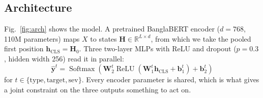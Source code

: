 \documentclass[conference]{IEEEtran}
\begin{document}
\subsection{Architecture}
Fig.~\ref{fig:arch} shows the model. A pretrained BanglaBERT encoder ($d = 768$, 110M parameters) maps $X$ to states $\mathbf{H} \in \mathbb{R}^{L \times d}$, from which we take the pooled first position $\mathbf{h}_{\text{CLS}} = \mathbf{H}_0$. Three two-layer MLPs with ReLU and dropout ($p = 0.3$, hidden width 256) read it in parallel:
\begin{equation}
\hat{\mathbf{y}}^t = \operatorname{Softmax}\!\left(\mathbf{W}_2^t \operatorname{ReLU}(\mathbf{W}_1^t \mathbf{h}_{\text{CLS}} + \mathbf{b}_1^t) + \mathbf{b}_2^t\right)
\end{equation}
for $t \in \{\text{type}, \text{target}, \text{sev}\}$. Every encoder parameter is shared, which is what gives a joint constraint on the three outputs something to act on.
\end{document}

